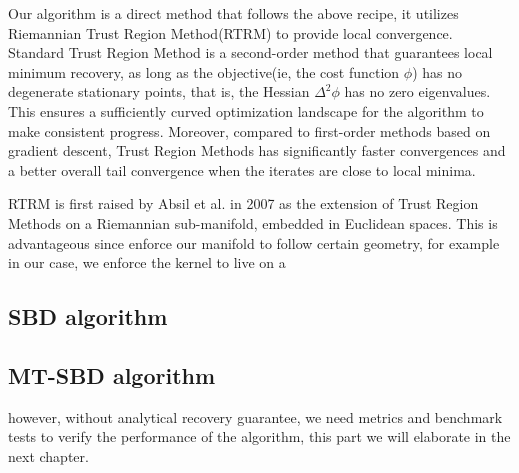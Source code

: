 Our algorithm is a direct method that follows the above recipe, it utilizes Riemannian Trust Region Method(RTRM) to provide local convergence. Standard Trust Region Method is a second-order method that guarantees local minimum recovery, as long as the objective(ie, the cost function $\phi$) has no degenerate stationary points, that is, the Hessian $\Delta^2\phi$ has no zero eigenvalues. This ensures a sufficiently curved optimization landscape for the algorithm to make consistent progress. Moreover, compared to first-order methods based on gradient descent, Trust Region Methods has significantly faster convergences and a better overall tail convergence when the iterates are close to local minima. 

\ac{RTRM} is first raised by Absil et al. in 2007 as the extension of Trust Region Methods on a Riemannian sub-manifold, embedded in Euclidean spaces. This is advantageous since enforce our manifold to follow certain geometry, for example in our case, we enforce the kernel to live on a 


\subsection{SBD algorithm}

\subsection{MT-SBD algorithm}
however, without analytical recovery guarantee, we need metrics and benchmark tests to verify the performance of the algorithm, this part we will elaborate in the next chapter. 
